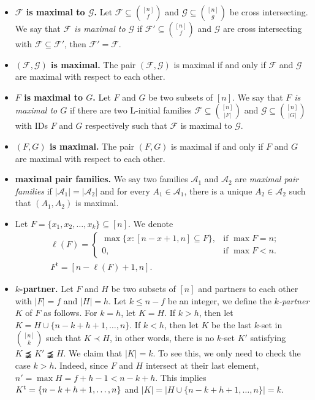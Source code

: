 \documentclass[a4paper,11pt]{article}
\begin{document}
\begin{itemize}
\item {\bf $\mathcal{F}$ is maximal to $\mathcal{G}$.} Let $\mathcal{F}\subseteq {[n]\choose f}$ and  $\mathcal{G}\subseteq {[n]\choose g}$ be cross intersecting. We say that {\em $\mathcal{F}$ is maximal to $\mathcal{G}$} if $\mathcal{F}'\subseteq {[n]\choose f}$ and $\mathcal{G}$ are cross intersecting with $\mathcal{F}\subseteq \mathcal{F}'$, then $\mathcal{F}'= \mathcal{F}$.


\item {\bf $(\mathcal{F}, \mathcal{G})$ is maximal.}
The pair $(\mathcal{F}, \mathcal{G})$ is maximal if and only if $\mathcal{F}$ and $\mathcal{G}$ are maximal with respect to each other.

\item {\bf $F$ is maximal to $G$.} Let $F$ and $G$ be two subsets of $[n]$. We  say that {\em $F$ is maximal to $G$} if there are two L-initial families $\mathcal{F}\subseteq{[n]\choose |F|}$ and $\mathcal{G}\subseteq{[n]\choose |G|}$ with IDs $F$ and $G$ respectively such that $\mathcal{F}$ is maximal to $\mathcal{G}$.



\item {\bf $(F, G)$ is maximal.}
The pair $({F}, {G})$ is maximal if and only if ${F}$ and ${G}$ are maximal with respect to each other.


\item {\bf maximal pair families.} We say two families $\mathcal{A}_1$ and $\mathcal{A}_2$ are \emph{maximal pair families} if $|\mathcal{A}_1|=|\mathcal{A}_2|$ and for every $A_1\in \mathcal{A}_1$, there is a unique $A_2\in \mathcal{A}_2$ such that $(A_1, A_2)$ is maximal.


\item Let $F=\{x_1, x_2, \dots, x_k\}\subseteq [n]$. We denote
\begin{align*}
&\ell(F)=
\begin{cases}
\max \{x: [n-x+1, n]\subseteq F\}, & \text{if $\max F=n$};\\
0, & \text{if $\max F<n$}.
\end{cases}\\
&F^{\mathrm{t}}=[n-\ell(F)+1, n].
\end{align*}

\item {\bf $k$-partner.} Let $F$ and $H$ be two subsets of $[n]$ and partners to each other with  $|F|=f$ and $|H|=h$. Let $k\leq n-f$ be an integer, we define the {\it $k$-partner} $K$ of $F$ as follows. For $k=h$, let $K=H$.  If $k>h$, then let $K= H\cup \{n-k+h+1, \dots, n\}$.  If $k< h$, then let $K$ be the last $k$-set in ${[n]\choose k}$ such that $K \prec H$, in other words, there is no $k$-set $K'$ satisfying $K\precneqq K'\precneqq H$. We claim that $|K|=k$. To see this, we only need to check the case $k>h$. Indeed, since $F$ and $H$ intersect at their last element, $n'=\max H=f+h-1<n-k+h$. This implies $K^{\rm t}=\{n-k+h+1, \dots, n\}$ and $|K|=| H\cup \{n-k+h+1, \dots, n\}|=k$.



\end{itemize}
\end{document}
